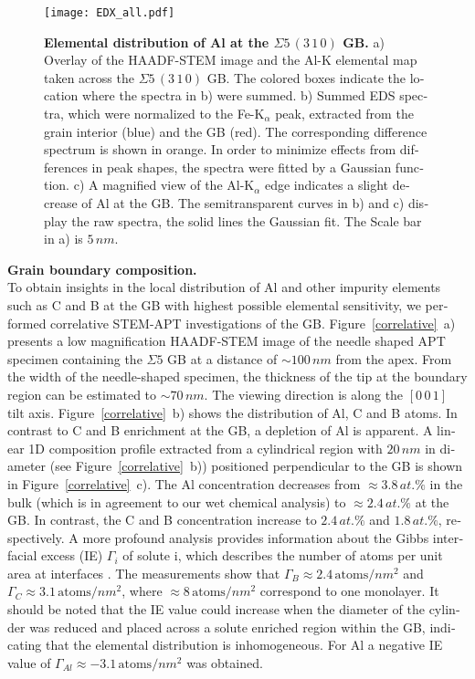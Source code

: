 \documentclass[12pt,a4paper,twoside,twocolumn,english,english]{article}
\begin{document}
\begin{otherlanguage}{english}
\begin{figure*}[htbp]
  \texttt{[image: EDX\_all.pdf]}
\caption{\textbf{Elemental distribution of Al at the $\Sigma 5\,(3\,1\,0)$ GB.} a) Overlay of the HAADF-STEM image and the Al-K elemental map taken across the $\Sigma 5\,(3\,1\,0)$ GB. The colored boxes indicate the location where the spectra in b) were summed. b) Summed EDS spectra, which were normalized to the Fe-K$_{\alpha}$ peak, extracted from the grain interior (blue) and the GB (red). The corresponding difference spectrum is shown in orange. In order to minimize effects from differences in peak shapes, the spectra were fitted by a Gaussian function. c) A magnified view of the Al-K$_\alpha$ edge indicates a slight decrease of Al at the GB. The semitransparent curves in b) and c) display the raw spectra, the solid lines the Gaussian fit. The Scale bar in a) is $5\,nm$.}
\label{EDX}
\end{figure*}
 
\noindent
\textbf{Grain boundary composition.}\\ To obtain insights in the local distribution of Al and other impurity elements such as C and B at the GB with highest possible elemental sensitivity, we performed correlative STEM-APT investigations of the GB. Figure~\ref{correlative}~a) presents a low magnification HAADF-STEM image of the needle shaped APT specimen containing the $\Sigma 5$ GB at a distance of $\sim100\,nm$ from the apex. From the width of the needle-shaped specimen, the thickness of the tip at the boundary region can be estimated to $\sim70\,nm$. The viewing direction is along the $[0\,0\,1]$ tilt axis. Figure~\ref{correlative}~b) shows the distribution of Al, C and B atoms. In contrast to C and B enrichment at the GB, a depletion of Al is apparent. A linear 1D composition profile extracted from a cylindrical region with $20\,nm$ in diameter (see Figure~\ref{correlative}~b)) positioned perpendicular to the GB is shown in Figure~\ref{correlative}~c). The Al concentration decreases from $\approx 3.8\,at.\%$ in the bulk (which is in agreement to our wet chemical analysis) to $\approx 2.4\,at.\%$ at the GB. In contrast, the C and B concentration increase to $2.4\,at.\%$ and $1.8\,at.\%$, respectively. A more profound analysis provides information about the Gibbs interfacial excess (IE) $\Gamma_i$ of solute i, which describes the number of atoms per unit area at interfaces \cite{krakauer_atomic_1993}. The measurements show that $\Gamma_B \approx 2.4\,\text{atoms}/nm^2$ and $\Gamma_C \approx 3.1\,\text{atoms}/nm^2$, where $\approx 8\,\text{atoms}/nm^2$ correspond to one monolayer. It should be noted that the IE value could increase when the diameter of the cylinder was reduced and placed across a solute enriched region within the GB, indicating that the elemental distribution is inhomogeneous. For Al a negative IE value of $\Gamma_{Al} \approx -3.1\,\text{atoms}/nm^2$ was obtained.   
 

\end{otherlanguage}
\end{document}
